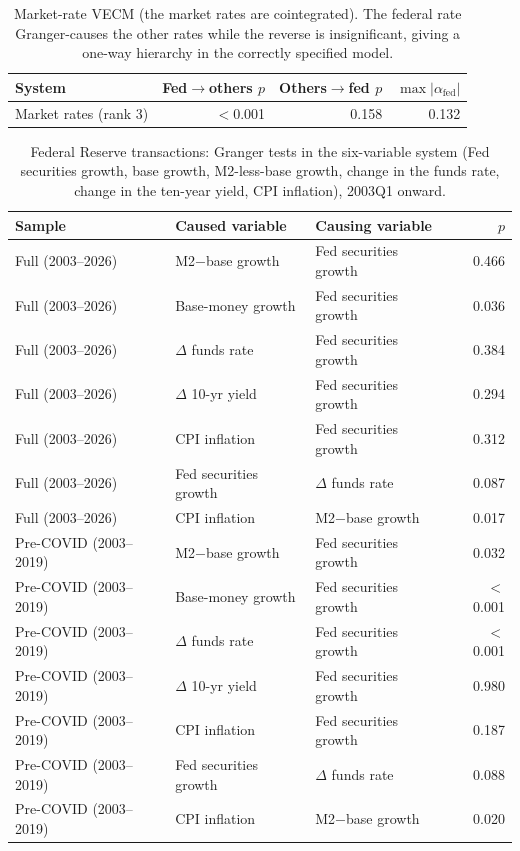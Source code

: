 \begin{table}[htbp]
\centering
\setlength{\belowcaptionskip}{8pt}
\small

\caption{Market-rate VECM (the market rates are cointegrated). The federal rate Granger-causes the other rates while the reverse is insignificant, giving a one-way hierarchy in the correctly specified model.}
\label{tab:ratehier_market}
\begin{tabular}{lrrr}
\toprule
System & Fed$\to$others $p$ & Others$\to$fed $p$ & $\max|\alpha_{\mathrm{fed}}|$ \\
\midrule
Market rates (rank 3) & $<$0.001 & 0.158 & 0.132 \\
\bottomrule
\end{tabular}
\end{table}

\begin{table}[htbp]
\centering
\setlength{\belowcaptionskip}{8pt}
\small

\caption{Federal Reserve transactions: Granger tests in the six-variable system (Fed securities growth, base growth, M2-less-base growth, change in the funds rate, change in the ten-year yield, CPI inflation), 2003Q1 onward.}
\label{tab:task4granger}
\begin{tabular}{lllr}
\toprule
Sample & Caused variable & Causing variable & $p$ \\
\midrule
Full (2003--2026) & M2$-$base growth & Fed securities growth & 0.466 \\
Full (2003--2026) & Base-money growth & Fed securities growth & 0.036 \\
Full (2003--2026) & $\Delta$ funds rate & Fed securities growth & 0.384 \\
Full (2003--2026) & $\Delta$ 10-yr yield & Fed securities growth & 0.294 \\
Full (2003--2026) & CPI inflation & Fed securities growth & 0.312 \\
Full (2003--2026) & Fed securities growth & $\Delta$ funds rate & 0.087 \\
Full (2003--2026) & CPI inflation & M2$-$base growth & 0.017 \\
Pre-COVID (2003--2019) & M2$-$base growth & Fed securities growth & 0.032 \\
Pre-COVID (2003--2019) & Base-money growth & Fed securities growth & $<$0.001 \\
Pre-COVID (2003--2019) & $\Delta$ funds rate & Fed securities growth & $<$0.001 \\
Pre-COVID (2003--2019) & $\Delta$ 10-yr yield & Fed securities growth & 0.980 \\
Pre-COVID (2003--2019) & CPI inflation & Fed securities growth & 0.187 \\
Pre-COVID (2003--2019) & Fed securities growth & $\Delta$ funds rate & 0.088 \\
Pre-COVID (2003--2019) & CPI inflation & M2$-$base growth & 0.020 \\
\bottomrule
\end{tabular}
\end{table}


